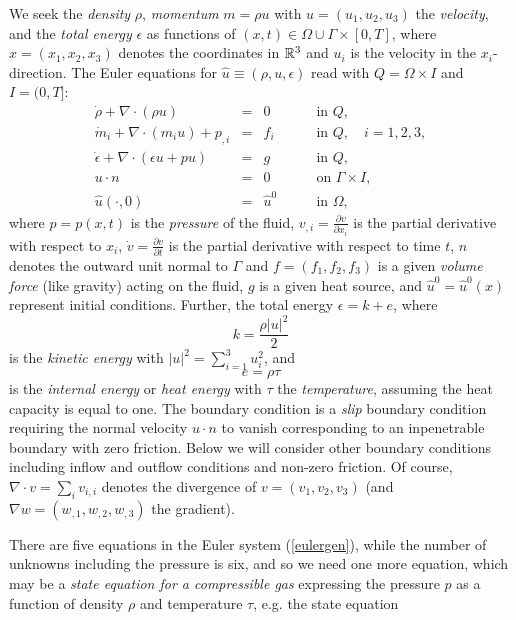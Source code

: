 We seek the
\emph{density} $\rho$, \emph{momentum} $m=\rho u$ with 
$u=(u_1,u_2,u_3)$ the \emph{velocity},
and the \emph{total energy} $\epsilon$ as functions of
$(x,t)\in \Omega\cup\Gamma\times [0,T]$, where $x=(x_1,x_2,x_3)$
denotes the coordinates in ${\mathbb{R}}^3$ and $u_i$ is the velocity
in the $x_i$-direction.  The Euler equations for 
$\hat u\equiv (\rho, u, \epsilon)$ 
read with $Q=\Omega\times I$ and $I=(0,T]$:   
\begin{equation}\label{eulergen} 
\begin{array}{rcll} 
\dot\rho +\nabla\cdot (\rho u)&=& 0\quad &\mbox{in }Q,\\
\dot m_i+\nabla\cdot(m_iu)+ p_{,i} &=&  f_i \quad &\mbox{in } Q,
\quad i=1,2,3, \\ 
 
\dot \epsilon +\nabla\cdot (\epsilon u+pu)&=& g\quad &\mbox{in }Q,\\
  u\cdot n &=& 0   \qquad  &\mbox{on }  \Gamma\times I,\\                       
\hat u(\cdot ,0) &=&  \hat u^0\qquad &\mbox{in }  \Omega , 
\end{array} 
\end{equation}   
where $p=p(x,t)$ is the {\it pressure} of the fluid, 
$v_{,i}=\frac{\partial v}{\partial x_i}$ is the partial
derivative with respect to $x_i$, $\dot v =\frac{\partial v}{\partial t}$ is the partial
derivative with respect to time $t$, $n$
denotes the outward unit normal to $\Gamma$ and
$f=(f_1,f_2,f_3)$ is a given \emph{volume force} (like gravity)
acting on the fluid, $g$ is a given heat source,
and $\hat u^0=\hat u^0(x)$ represent 
initial conditions. 
Further, the total energy $\epsilon =k+e$, where
\[
 k=\frac{\rho \vert u\vert^2}{2}
\]
 is the \emph{kinetic energy} with $\vert u\vert^2=\sum_{i=1}^3u_i^2$,
and 
\[
e=\rho\tau
\]
is the \emph{internal energy} or \emph{heat energy} with $\tau$ the \emph{temperature},
assuming the heat capacity is equal to one.
The boundary condition is a \emph{slip} boundary condition
requiring the normal velocity $u\cdot n$ to vanish 
corresponding to an inpenetrable boundary with zero friction.
Below we will consider other boundary conditions including 
inflow and outflow conditions and non-zero friction.
Of course, $\nabla\cdot v=\sum_iv_{i,i}$ denotes the divergence
of $v=(v_1,v_2,v_3)$ (and 
$\nabla w=(w_{,1},w_{,2},w_{,3})$ the gradient).

There are five equations in the Euler system
(\ref{eulergen}), while the number of unknowns
including the pressure is six, and so we need one more equation,
which may be a \emph{state equation for a compressible gas}
expressing the pressure $p$ as a function of density $\rho$
and temperature $\tau$, e.g. the state equation
 
